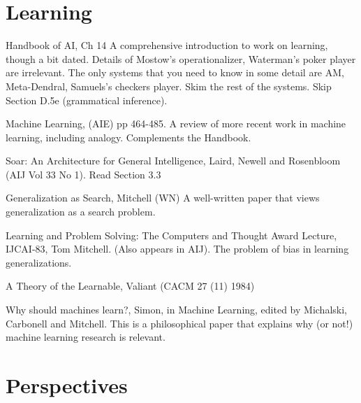 \section{Learning}
\label{sec:learning}

\begin{required}


  \paper  Handbook of AI, Ch 14
     A comprehensive introduction to work on learning, though a bit
dated.  Details of Mostow's operationalizer, Waterman's poker player
are irrelevant. The only systems that you need to know in some detail
are AM, Meta-Dendral, Samuels's checkers player.  Skim the rest of the
systems. Skip Section D.5e (grammatical inference).

  \paper Machine Learning, (AIE) pp 464-485.  A review of more recent
work in machine learning, including analogy. Complements the Handbook.

  \paper Soar: An Architecture for General Intelligence, Laird, Newell
and Rosenbloom (AIJ Vol 33 No 1).  Read Section 3.3

\end{required}

\begin{optional}

  \paper Generalization as Search, Mitchell (WN) A well-written paper
that views generalization as a search problem.

  \paper Learning and Problem Solving: The Computers and Thought Award
Lecture, IJCAI-83, Tom Mitchell.  (Also appears in AIJ). The problem
of bias in learning generalizations.

  \paper  A Theory of the Learnable, Valiant (CACM 27 (11) 1984)

  \paper Why should machines learn?, Simon, in Machine Learning,
edited by Michalski, Carbonell and Mitchell.
 This is a philosophical paper that explains why (or not!) machine
learning research is relevant. 

\end{optional}


\section{Perspectives}
\label{sec:perspectives}
\label{sec:last}

